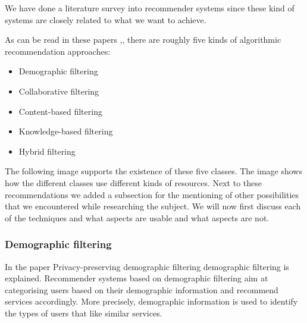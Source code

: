 We have done a literature survey into recommender systems since these kind of systems are closely related to what we want to achieve.

As can be read in these papers \citep{Breese1998},\citep{Peter2007}, there are roughly five kinds of algorithmic recommendation approaches:

\begin{itemize}
\item Demographic filtering \citep{Peter2007}
\item Collaborative filtering \citep{Peter2007}\citep{Breese1998}
\item Content-based filtering \citep{Peter2007}
\item Knowledge-based filtering \citep{Peter2007}\cite{burke2000knowledge}
\item Hybrid filtering \citep{Peter2007}
\end{itemize}

The following image supports the existence of these five classes.
The image shows how the different classes use different kinds of resources.
Next to these recommendations we added a subsection for the mentioning of other possibilities that we encountered while researching the subject.
We will now first discuss each of the techniques and what aspects are usable and what aspects are not.

\subsubsection*{Demographic filtering}
In the paper Privacy-preserving demographic filtering\cite{aimeur2006privacy} demographic filtering is explained.
Recommender systems based on demographic filtering aim at categorising users based on their demographic information and recommend services accordingly. 
More precisely, demographic information is used to identify the types of users that like similar services. 


